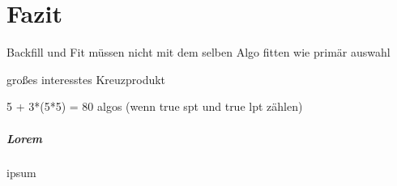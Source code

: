 \chapter{Fazit}

Backfill und Fit müssen nicht mit dem selben Algo fitten wie primär auswahl

großes interesstes Kreuzprodukt

5 + 3*(5*5) = 80 algos (wenn true spt und true lpt zählen)
\paragraph{Lorem}


ipsum


